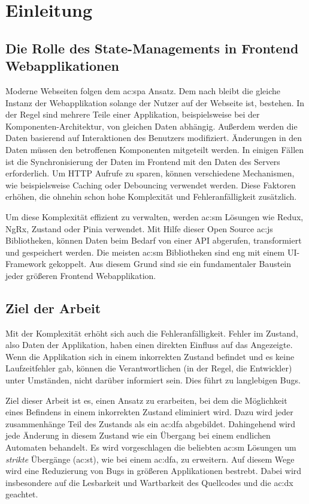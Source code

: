 \chapter{Einleitung}

\section{Die Rolle des State-Managements in Frontend Webapplikationen}

Moderne Webseiten folgen dem \acrlong{ac:spa} Ansatz. Dem nach bleibt die gleiche Instanz der Webapplikation solange der Nutzer auf der Webseite ist, bestehen. In der Regel sind mehrere Teile einer Applikation, beispielsweise bei der Komponenten-Architektur, von gleichen Daten abhängig. Außerdem werden die Daten basierend auf Interaktionen des Benutzers modifiziert. Änderungen in den Daten müssen den betroffenen Komponenten mitgeteilt werden. In einigen Fällen ist die Synchronisierung der Daten im Frontend mit den Daten des Servers erforderlich. Um HTTP Aufrufe zu sparen, können verschiedene Mechanismen, wie beispielsweise Caching oder Debouncing verwendet werden. Diese Faktoren erhöhen, die ohnehin schon hohe Komplexität und Fehleranfälligkeit zusätzlich.

Um diese Komplexität effizient zu verwalten, werden \acrlong{ac:sm} Lösungen wie Redux, NgRx, Zustand oder Pinia verwendet. Mit Hilfe dieser Open Source \acrlong{ac:js} Bibliotheken, können Daten beim Bedarf von einer API abgerufen, transformiert und gespeichert werden. Die meisten \acrlong{ac:sm} Bibliotheken sind eng mit einem UI-Framework gekoppelt. Aus diesem Grund sind sie ein fundamentaler Baustein jeder größeren Frontend Webapplikation.

\section{Ziel der Arbeit}

Mit der Komplexität erhöht sich auch die Fehleranfälligkeit. Fehler im Zustand, also Daten der Applikation, haben einen direkten Einfluss auf das Angezeigte. Wenn die Applikation sich in einem inkorrekten Zustand befindet und es keine Laufzeitfehler gab, können die Verantwortlichen (in der Regel, die Entwickler) unter Umständen, nicht darüber informiert sein. Dies führt zu langlebigen Bugs.

Ziel dieser Arbeit ist es, einen Ansatz zu erarbeiten, bei dem die Möglichkeit eines Befindens in einem inkorrekten Zustand eliminiert wird. Dazu wird jeder zusammenhänge Teil des Zustands als ein \acrlong{ac:dfa} abgebildet. Dahingehend wird jede Änderung in diesem Zustand wie ein Übergang bei einem endlichen Automaten behandelt. Es wird vorgeschlagen die beliebten \acrlong{ac:sm} Lösungen um \textit{strikte} Übergänge (\acrshort{ac:st}), wie bei einem \acrlong{ac:dfa}, zu erweitern. Auf diesem Wege wird eine Reduzierung von Bugs in größeren Applikationen bestrebt. Dabei wird insbesondere auf die Lesbarkeit und Wartbarkeit des Quellcodes und die \acrlong{ac:dx} geachtet.

